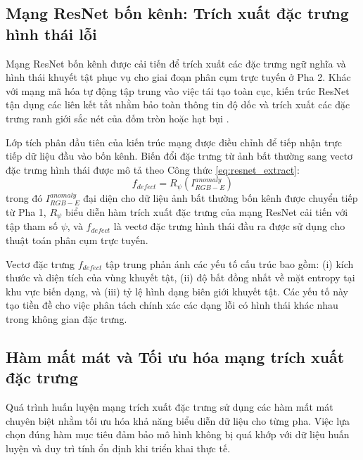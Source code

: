 \subsection{Mạng ResNet bốn kênh: Trích xuất đặc trưng hình thái lỗi}
\label{subsec:resnet4khenh}

Mạng ResNet bốn kênh được cải tiến để trích xuất các đặc trưng ngữ nghĩa và hình thái khuyết tật phục vụ cho giai đoạn phân cụm trực tuyến ở Pha 2. Khác với mạng mã hóa tự động tập trung vào việc tái tạo toàn cục, kiến trúc ResNet tận dụng các liên kết tắt nhằm bảo toàn thông tin độ dốc và trích xuất các đặc trưng ranh giới sắc nét của đốm tròn hoặc hạt bụi \cite{he2016deep}.

Lớp tích phân đầu tiên của kiến trúc mạng được điều chỉnh để tiếp nhận trực tiếp dữ liệu đầu vào bốn kênh. Biến đổi đặc trưng từ ảnh bất thường sang vectơ đặc trưng hình thái được mô tả theo Công thức \ref{eq:resnet_extract}:
\begin{equation}
\label{eq:resnet_extract}
f_{defect} = R_\psi(I_{RGB-E}^{anomaly})
\end{equation}
trong đó $I_{RGB-E}^{anomaly}$ đại diện cho dữ liệu ảnh bất thường bốn kênh được chuyển tiếp từ Pha 1, $R_\psi$ biểu diễn hàm trích xuất đặc trưng của mạng ResNet cải tiến với tập tham số $\psi$, và $f_{defect}$ là vectơ đặc trưng hình thái đầu ra được sử dụng cho thuật toán phân cụm trực tuyến.

Vectơ đặc trưng $f_{defect}$ tập trung phản ánh các yếu tố cấu trúc bao gồm: (i) kích thước và diện tích của vùng khuyết tật, (ii) độ bất đồng nhất về mặt entropy tại khu vực biến dạng, và (iii) tỷ lệ hình dạng biên giới khuyết tật. Các yếu tố này tạo tiền đề cho việc phân tách chính xác các dạng lỗi có hình thái khác nhau trong không gian đặc trưng.

\subsection{Hàm mất mát và Tối ưu hóa mạng trích xuất đặc trưng}
\label{subsec:hammatmat_toiuu}

Quá trình huấn luyện mạng trích xuất đặc trưng sử dụng các hàm mất mát chuyên biệt nhằm tối ưu hóa khả năng biểu diễn dữ liệu cho từng pha. Việc lựa chọn đúng hàm mục tiêu đảm bảo mô hình không bị quá khớp với dữ liệu huấn luyện và duy trì tính ổn định khi triển khai thực tế.

